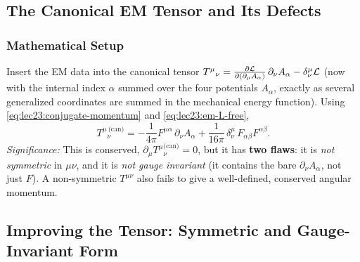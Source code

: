 
\subsection{The Canonical EM Tensor and Its Defects}
\label{subsec:lec23:canonical-em}

\subsubsection*{Mathematical Setup}
Insert the EM data into the canonical tensor
$T^\mu{}_\nu=\pdv{\mathcal L}{(\partial_\mu A_\alpha)}\,\partial_\nu A_\alpha
            -\delta^\mu_\nu\mathcal L$
(now with the internal index $\alpha$ summed over the four potentials $A_\alpha$, exactly as
several generalized coordinates are summed in the mechanical energy function). Using
\eqref{eq:lec23:conjugate-momentum} and \eqref{eq:lec23:em-L-free},
\begin{equation}\label{eq:lec23:canonical-em}
  \boxed{\;
  T^{\mu}{}_{\nu}^{\,\text{(can)}}
  =-\frac{1}{4\pi}F^{\mu\alpha}\,\partial_\nu A_\alpha
   +\frac{1}{16\pi}\,\delta^\mu_\nu\,F_{\alpha\beta}F^{\alpha\beta}.\;}
\end{equation}
\textit{Significance:} This is conserved, $\partial_\mu T^\mu{}_\nu^{\text{(can)}}=0$, but it
has \textbf{two flaws}: it is \emph{not symmetric} in $\mu\nu$, and it is \emph{not gauge
invariant} (it contains the bare $\partial_\nu A_\alpha$, not just $F$). A non-symmetric
$T^{\mu\nu}$ also fails to give a well-defined, conserved angular momentum.

\subsection{Improving the Tensor: Symmetric and Gauge-Invariant Form}
\label{subsec:lec23:symmetrization}

